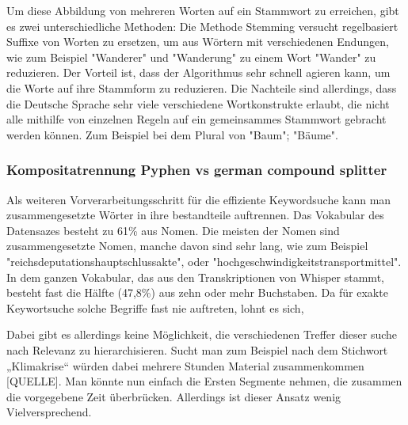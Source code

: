 Um diese Abbildung von mehreren Worten auf ein Stammwort zu erreichen, gibt es zwei unterschiedliche Methoden:
Die Methode Stemming versucht regelbasiert Suffixe von Worten zu ersetzen, um aus Wörtern mit verschiedenen Endungen, wie zum Beispiel "Wanderer" und "Wanderung" zu einem Wort "Wander" zu reduzieren.
Der Vorteil ist, dass der Algorithmus sehr schnell agieren kann, um die Worte auf ihre Stammform zu reduzieren.
Die Nachteile sind allerdings, dass die Deutsche Sprache sehr viele verschiedene Wortkonstrukte erlaubt, die nicht alle mithilfe von einzelnen Regeln auf ein gemeinsammes Stammwort gebracht werden können. 
Zum Beispiel bei dem Plural von "Baum"; "Bäume".


\subsubsection{Kompositatrennung Pyphen vs german compound splitter}

Als weiteren Vorverarbeitungsschritt für die effiziente Keywordsuche kann man zusammengesetzte Wörter in ihre bestandteile auftrennen.
Das Vokabular des Datensazes besteht zu 61\% aus Nomen. 
Die meisten der Nomen sind zusammengesetzte Nomen, manche davon sind sehr lang, wie zum Beispiel "reichsdeputationshauptschlussakte", oder "hochgeschwindigkeitstransportmittel".
In dem ganzen Vokabular, das aus den Transkriptionen von Whisper stammt, besteht fast die Hälfte (47,8\%) aus zehn oder mehr Buchstaben.
Da für exakte Keywortsuche solche Begriffe fast nie auftreten, lohnt es sich, 



Dabei gibt es allerdings keine Möglichkeit, die verschiedenen Treffer dieser suche nach Relevanz zu hierarchisieren. Sucht man zum Beispiel nach dem Stichwort „Klimakrise“ würden dabei mehrere Stunden Material zusammenkommen [QUELLE]. 
Man könnte nun einfach die Ersten Segmente nehmen, die zusammen die vorgegebene Zeit überbrücken. 
Allerdings ist dieser Ansatz wenig Vielversprechend. 


